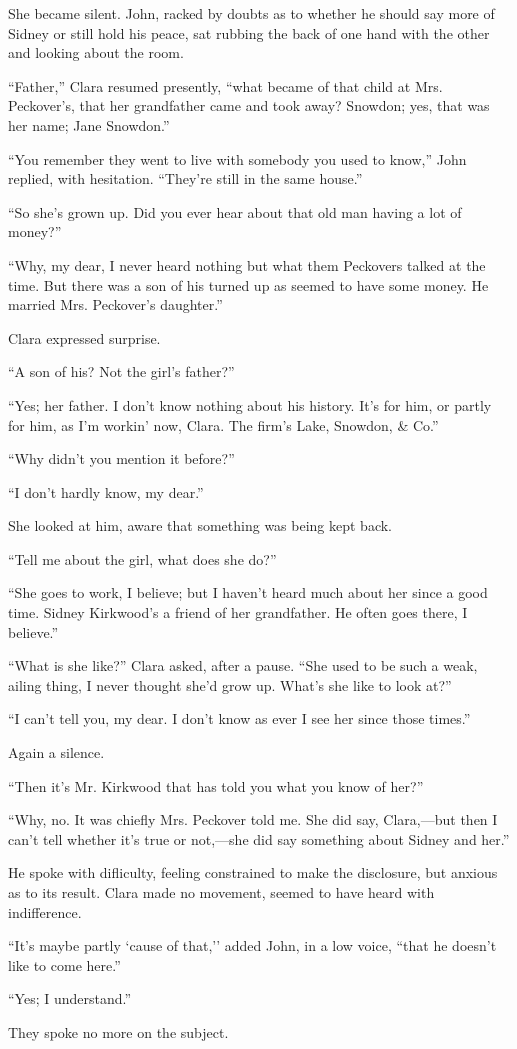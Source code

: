 She became silent. John, racked by doubts as to whether he should say
more of Sidney or still hold his peace, sat rubbing the back of one hand
with the other and looking about the room.

``Father,'' Clara resumed presently, ``what became of that child at Mrs.
Peckover's, that her grandfather came and took away? Snowdon; yes, that
was her name; Jane Snowdon.''

``You remember they went to live with somebody you used to know,'' John
replied, with hesitation. ``They're still in the same house.''

``So she's grown up. Did you ever hear about that old man having a lot
of money?''

``Why, my dear, I never heard nothing but what them Peckovers talked at
the time. But there was a son of his turned up as seemed to have some
money. He married Mrs. Peckover's daughter.''

Clara expressed surprise.

``A son of his? Not the girl's father?''

``Yes; her father. I don't know nothing about his history. It's for him,
or partly for {\protect\hypertarget{68}{}{}}him, as I'm workin' now,
Clara. The firm's Lake, Snowdon, \& Co.''

``Why didn't you mention it before?''

``I don't hardly know, my dear.''

She looked at him, aware that something was being kept back.

``Tell me about the girl, what does she do?''

``She goes to work, I believe; but I haven't heard much about her since
a good time. Sidney Kirkwood's a friend of her grandfather. He often
goes there, I believe.''

``What is she like?'' Clara asked, after a pause. ``She used to be such
a weak, ailing thing, I never thought she'd grow up. What's she like to
look at?''

``I can't tell you, my dear. I don't know as ever I see her since those
times.''

Again a silence.

``Then it's Mr. Kirkwood that has told you what you know of her?''

``Why, no. It was chiefly Mrs. Peckover told me. She did say,
Clara,---but then I can't tell whether it's true or not,---she did say
something about Sidney and her.''

He spoke with difliculty, feeling constrained
{\protect\hypertarget{69}{}{}}to make the disclosure, but anxious as to
its result. Clara made no movement, seemed to have heard with
indifference.

``It's maybe partly `cause of that,'' added John, in a low voice, ``that
he doesn't like to come here.''

``Yes; I understand.''

They spoke no more on the subject.
